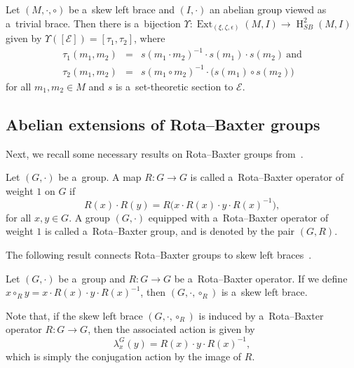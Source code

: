 \documentclass{jonasart}
\theoremstyle{plain}
\DeclareMathOperator{\Ext}{Ext}
\DeclareMathOperator{\Ho}{H}
\begin{document}
	\begin{theorem}\label{gbij-thm sb}
		Let $(M, \cdot, \circ)$ be a~skew left brace and $(I, \cdot)$ an abelian group viewed as a~trivial brace. Then there is a~bijection $\Upsilon:\Ext_{(\xi, \zeta, \epsilon)}(M, I) \rightarrow \Ho^2_{SB}(M, I)$ given by $\Upsilon([\mathcal{E}])=[\tau_1, \tau_2 ]$, where
		\begin{eqnarray}
			\tau_1 (m_1, m_2 ) &= & s(m_1 \cdot m_2 )^{-1} \cdot s(m_1 ) \cdot s(m_2 )\label{tau sb}~\textrm{and}\\
			\tau_2 (m_1, m_2 ) &=& s(m_1 \circ m_2 )^{-1} \cdot \big(s(m_1 ) \circ s(m_2 )\big)\label{tildetau sb}
		\end{eqnarray}
		for all $m_1, m_2 \in M$ and $s$ is a~set-theoretic section to $\mathcal{E}$.
	\end{theorem}
	
	\subsection{Abelian extensions of Rota--Baxter groups}\label{RB cohomology}
	Next, we recall some necessary results on Rota--Baxter groups from~\cite[Section 3, 4]{MR4644858}.
	
	\begin{definition}
		Let $(G, \cdot)$ be a~group. A map $R: G \rightarrow G$ is called a~Rota--Baxter operator of weight $1$ on $G$ if
		\[
		R(x) \cdot R(y)= R \big(x \cdot R(x) \cdot y \cdot R(x)^{-1} \big),
		\]
		for all $x, y \in G$. 	A group $(G, \cdot)$ equipped with a~Rota--Baxter operator of weight $1$ is called a~Rota--Baxter group, and is denoted by the pair $(G,R)$.
	\end{definition}
	
	The following result connects Rota--Baxter groups to skew left braces~\cite[Proposition~3.1]{MR4370524}.
	
	\begin{proposition}
		Let $(G,\cdot)$ be a~group and $R: G \to G$ be a~Rota--Baxter operator. If we define $x \circ_R y = x \cdot R(x) \cdot y \cdot R(x)^{-1}$, then $(G, \cdot, \circ_R )$ is a~skew left brace.
	\end{proposition}
	
	Note that, if the skew left brace $(G, \cdot, \circ_R )$ is induced by a~Rota--Baxter operator $R: G \to G$, then the associated action is given by
	\begin{equation}\label{RB induced SLB associated action}
		\lambda^G_x (y)= R(x) \cdot y \cdot R(x)^{-1},
	\end{equation}
	which is simply the conjugation action by the image of $R$.
	
\end{document}
